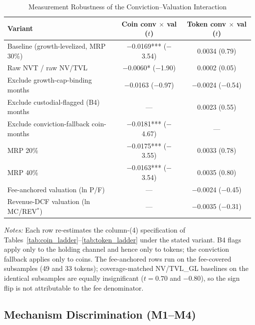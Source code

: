 \documentclass[12pt]{article}
\begin{document}
\begin{table}[ht]
\centering
\caption{Measurement Robustness of the Conviction--Valuation Interaction}
\label{tab:measurement}
\small
\begin{tabular}{lcc}
\toprule
Variant & Coin conv $\times$ val ($t$) & Token conv $\times$ val ($t$) \\
\midrule
Baseline (growth-levelized, MRP 30\%) & $-$0.0169*** ($-$3.54) & 0.0034 (0.79) \\
Raw NVT / raw NV/TVL & $-$0.0060* ($-$1.90) & 0.0002 (0.05) \\
Exclude growth-cap-binding months & $-$0.0163 ($-$0.97) & $-$0.0024 ($-$0.54) \\
Exclude custodial-flagged (B4) months & --- & 0.0023 (0.55) \\
Exclude conviction-fallback coin-months & $-$0.0181*** ($-$4.67) & --- \\
MRP 20\% & $-$0.0175*** ($-$3.55) & 0.0033 (0.78) \\
MRP 40\% & $-$0.0163*** ($-$3.54) & 0.0035 (0.80) \\
Fee-anchored valuation (ln P/F) & --- & $-$0.0024 ($-$0.45) \\
Revenue-DCF valuation (ln MC/REV$^*$) & --- & $-$0.0035 ($-$0.31) \\
\bottomrule
\end{tabular}
\smallskip

\parbox{0.9\linewidth}{\footnotesize
\textit{Notes:} Each row re-estimates the column-(4) specification of
Tables~\ref{tab:coin_ladder}--\ref{tab:token_ladder} under the stated variant. B4 flags
apply only to the holding channel and hence only to tokens; the conviction fallback
applies only to coins. The fee-anchored rows run on the fee-covered subsamples (49 and
33 tokens); coverage-matched NV/TVL\_GL baselines on the identical subsamples are
equally insignificant ($t=0.70$ and $-0.80$), so the sign flip is not attributable to
the fee denominator.}
\end{table}

\FloatBarrier
\subsection{Mechanism Discrimination (M1--M4)}
\label{sec:robust_mech}
\end{document}
